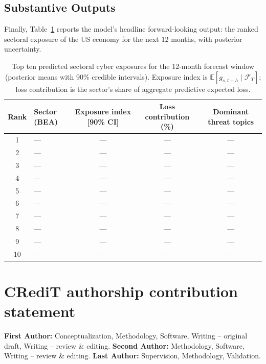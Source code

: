 \documentclass[review]{elsarticle}
\newcommand{\E}{\mathbb{E}}
\begin{document}
\subsection{Substantive Outputs}

Finally, Table~\ref{tab:sector} reports the model's headline forward-looking output: the ranked sectoral exposure of the US economy for the next 12 months, with posterior uncertainty.

\begin{table}
\centering
\caption{Top ten predicted sectoral cyber exposures for the 12-month forecast window (posterior means with 90\% credible intervals). Exposure index is $\E[g_{s,t+h} \mid \mathcal{F}_T]$; loss contribution is the sector's share of aggregate predictive expected loss.}
\label{tab:sector}
\small
\begin{tabular}{clccc}
\toprule
Rank & Sector (BEA) & Exposure index [90\% CI] & Loss contribution (\%) & Dominant threat topics \\
\midrule
1  & --- & --- & --- & --- \\
2  & --- & --- & --- & --- \\
3  & --- & --- & --- & --- \\
4  & --- & --- & --- & --- \\
5  & --- & --- & --- & --- \\
6  & --- & --- & --- & --- \\
7  & --- & --- & --- & --- \\
8  & --- & --- & --- & --- \\
9  & --- & --- & --- & --- \\
10 & --- & --- & --- & --- \\
\bottomrule
\end{tabular}
\end{table}


\section*{CRediT authorship contribution statement}
\textbf{First Author:} Conceptualization, Methodology, Software, Writing – original draft, Writing – review \& editing. \textbf{Second Author:} Methodology, Software, Writing – review \& editing. \textbf{Last Author:} Supervision, Methodology, Validation.

\end{document}

